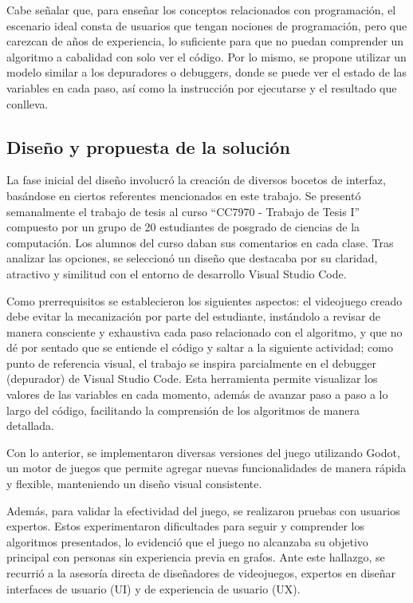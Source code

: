 Cabe señalar que, para enseñar los conceptos relacionados con programación, el escenario ideal consta de usuarios que tengan nociones de programación, pero que carezcan de años de experiencia, lo suficiente para que no puedan comprender un algoritmo a cabalidad con solo ver el código. Por lo mismo, se propone utilizar un modelo similar a los depuradores o debuggers, donde se puede ver el estado de las variables en cada paso, así como la instrucción por ejecutarse y el resultado que conlleva.


\subsection{Diseño y propuesta de la solución}

La fase inicial del diseño involucró la creación de diversos bocetos de interfaz, basándose en ciertos referentes mencionados en este trabajo. Se presentó semanalmente el trabajo de tesis al curso ``CC7970 - Trabajo de Tesis I'' compuesto por un grupo de 20 estudiantes de posgrado de ciencias de la computación. Los alumnos del curso daban sus comentarios en cada clase. Tras analizar las opciones, se seleccionó un diseño que destacaba por su claridad, atractivo y similitud con el entorno de desarrollo Visual Studio Code.

Como prerrequisitos se establecieron los siguientes aspectos: el videojuego creado debe evitar la mecanización por parte del estudiante, instándolo a revisar de manera consciente y exhaustiva cada paso relacionado con el algoritmo, y que no dé por sentado que se entiende el código y saltar a la siguiente actividad; como punto de referencia visual, el trabajo se inspira parcialmente en el debugger (depurador) de Visual Studio Code. Esta herramienta permite visualizar los valores de las variables en cada momento, además de avanzar paso a paso a lo largo del código, facilitando la comprensión de los algoritmos de manera detallada.

Con lo anterior, se implementaron diversas versiones del juego utilizando Godot, un motor de juegos que permite agregar nuevas funcionalidades de manera rápida y flexible, manteniendo un diseño visual consistente.

Además, para validar la efectividad del juego, se realizaron pruebas con usuarios expertos. Estos experimentaron dificultades para seguir y comprender los algoritmos presentados, lo evidenció que el juego no alcanzaba su objetivo principal con personas sin experiencia previa en grafos. Ante este hallazgo, se recurrió a la asesoría directa de diseñadores de videojuegos, expertos en diseñar interfaces de usuario (UI) y de experiencia de usuario (UX).

